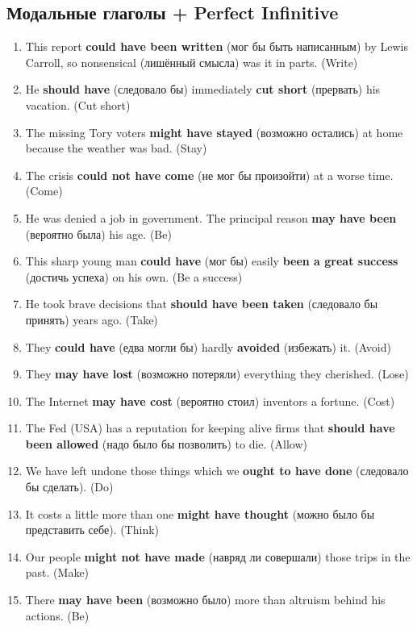 \documentclass[main.tex]{subfiles}
\begin{document}
\subsection{Модальные глаголы + Perfect Infinitive}


\begin{enumerate}[nosep,leftmargin=*]
	\item This report \textbf{could have been written} (мог бы быть написанным) by Lewis Carroll, so nonsensical (лишённый смысла) was it in parts. (Write)
	\item He \textbf{should have} (следовало бы) immediately \textbf{cut short} (прервать) his vacation. (Cut short)
	\item The missing Tory voters \textbf{might have stayed} (возможно остались) at home because the weather was bad. (Stay)
	\item The crisis \textbf{could not have come} (не мог бы произойти) at a worse time. (Come)
	\item He was denied a job in government. The principal reason \textbf{may have been} (вероятно была) his age. (Be)
	\item This sharp young man \textbf{could have} (мог бы) easily \textbf{been a great success} (достичь успеха) on his own. (Be a success)
	\item He took brave decisions that \textbf{should have been taken} (следовало бы принять) years ago. (Take)
	\item They \textbf{could have} (едва могли бы) hardly \textbf{avoided} (избежать) it. (Avoid)
	\item They \textbf{may have lost} (возможно потеряли) everything they cherished. (Lose)
	\item The Internet \textbf{may have cost} (вероятно стоил) inventors a fortune. (Cost)
	\item The Fed (USA) has a reputation for keeping alive firms that \textbf{should have been allowed} (надо было бы позволить) to die. (Allow)
	\item We have left undone those things which we \textbf{ought to have done} (следовало бы сделать). (Do)
	\item It costs a little more than one \textbf{might have thought} (можно было бы представить себе). (Think)
	\item Our people \textbf{might not have made} (навряд ли совершали) those trips in the past. (Make)
	\item There \textbf{may have been} (возможно было) more than altruism behind his actions. (Be)
\end{enumerate}
\end{document}

